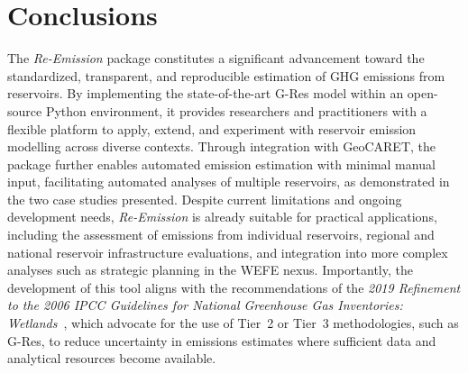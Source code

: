 \documentclass[final,1p,times]{elsarticle}
\begin{document}

\section{Conclusions}
\label{sec:conclusions}

The \emph{Re-Emission} package constitutes a significant advancement toward the standardized, transparent, and reproducible estimation of \acl{GHG} emissions from reservoirs. 
By implementing the state-of-the-art G-Res model within an open-source Python environment, it provides researchers and practitioners with a flexible platform to apply, extend, and experiment with reservoir emission modelling across diverse contexts.
Through integration with GeoCARET, the package further enables automated emission estimation with minimal manual input, facilitating automated analyses of multiple reservoirs, as demonstrated in the two case studies presented. 
Despite current limitations and ongoing development needs, \emph{Re-Emission} is already suitable for practical applications, including the assessment of emissions from individual reservoirs, regional and national reservoir infrastructure evaluations, and integration into more complex analyses such as strategic planning in the \ac{WEFE} nexus.
Importantly, the development of this tool aligns with the recommendations of the \emph{2019 Refinement to the 2006 \acs{IPCC} Guidelines for National Greenhouse Gas Inventories: Wetlands}~\cite{IPCC2019}, which advocate for the use of Tier~2 or Tier~3 methodologies, such as G-Res, to reduce uncertainty in emissions estimates where sufficient data and analytical resources become available.
\end{document}
